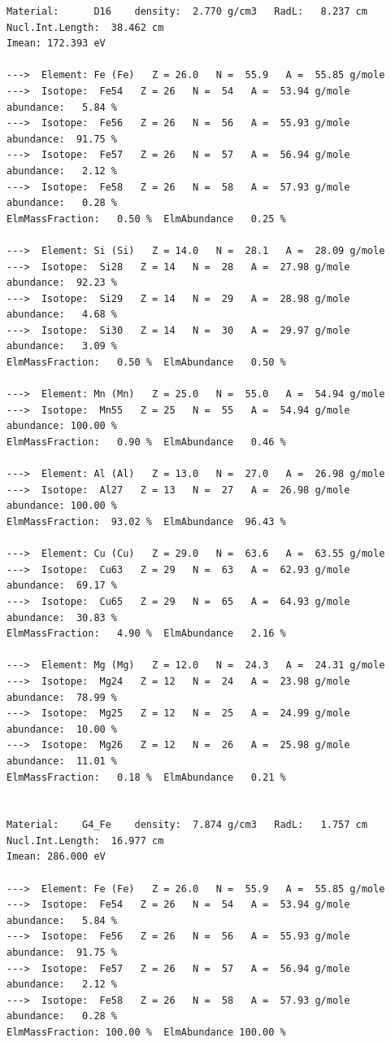 {\begin{verbatim}
Material:      D16    density:  2.770 g/cm3   RadL:   8.237 cm   Nucl.Int.Length:  38.462 cm 
Imean: 172.393 eV 

--->  Element: Fe (Fe)   Z = 26.0   N =  55.9   A =  55.85 g/mole
--->  Isotope:  Fe54   Z = 26   N =  54   A =  53.94 g/mole   abundance:   5.84 %
--->  Isotope:  Fe56   Z = 26   N =  56   A =  55.93 g/mole   abundance:  91.75 %
--->  Isotope:  Fe57   Z = 26   N =  57   A =  56.94 g/mole   abundance:   2.12 %
--->  Isotope:  Fe58   Z = 26   N =  58   A =  57.93 g/mole   abundance:   0.28 %
ElmMassFraction:   0.50 %  ElmAbundance   0.25 % 

--->  Element: Si (Si)   Z = 14.0   N =  28.1   A =  28.09 g/mole
--->  Isotope:  Si28   Z = 14   N =  28   A =  27.98 g/mole   abundance:  92.23 %
--->  Isotope:  Si29   Z = 14   N =  29   A =  28.98 g/mole   abundance:   4.68 %
--->  Isotope:  Si30   Z = 14   N =  30   A =  29.97 g/mole   abundance:   3.09 %
ElmMassFraction:   0.50 %  ElmAbundance   0.50 % 

--->  Element: Mn (Mn)   Z = 25.0   N =  55.0   A =  54.94 g/mole
--->  Isotope:  Mn55   Z = 25   N =  55   A =  54.94 g/mole   abundance: 100.00 %
ElmMassFraction:   0.90 %  ElmAbundance   0.46 % 

--->  Element: Al (Al)   Z = 13.0   N =  27.0   A =  26.98 g/mole
--->  Isotope:  Al27   Z = 13   N =  27   A =  26.98 g/mole   abundance: 100.00 %
ElmMassFraction:  93.02 %  ElmAbundance  96.43 % 

--->  Element: Cu (Cu)   Z = 29.0   N =  63.6   A =  63.55 g/mole
--->  Isotope:  Cu63   Z = 29   N =  63   A =  62.93 g/mole   abundance:  69.17 %
--->  Isotope:  Cu65   Z = 29   N =  65   A =  64.93 g/mole   abundance:  30.83 %
ElmMassFraction:   4.90 %  ElmAbundance   2.16 % 

--->  Element: Mg (Mg)   Z = 12.0   N =  24.3   A =  24.31 g/mole
--->  Isotope:  Mg24   Z = 12   N =  24   A =  23.98 g/mole   abundance:  78.99 %
--->  Isotope:  Mg25   Z = 12   N =  25   A =  24.99 g/mole   abundance:  10.00 %
--->  Isotope:  Mg26   Z = 12   N =  26   A =  25.98 g/mole   abundance:  11.01 %
ElmMassFraction:   0.18 %  ElmAbundance   0.21 % 


Material:    G4_Fe    density:  7.874 g/cm3   RadL:   1.757 cm   Nucl.Int.Length:  16.977 cm 
Imean: 286.000 eV 

--->  Element: Fe (Fe)   Z = 26.0   N =  55.9   A =  55.85 g/mole
--->  Isotope:  Fe54   Z = 26   N =  54   A =  53.94 g/mole   abundance:   5.84 %
--->  Isotope:  Fe56   Z = 26   N =  56   A =  55.93 g/mole   abundance:  91.75 %
--->  Isotope:  Fe57   Z = 26   N =  57   A =  56.94 g/mole   abundance:   2.12 %
--->  Isotope:  Fe58   Z = 26   N =  58   A =  57.93 g/mole   abundance:   0.28 %
ElmMassFraction: 100.00 %  ElmAbundance 100.00 % 



\end{verbatim}}
